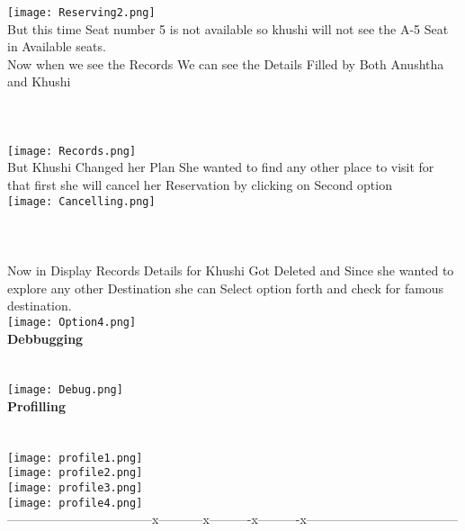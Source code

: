 \documentclass{article}
\begin{document}
\texttt{[image: Reserving2.png]}\\
But this time Seat number 5 is not available so khushi will not see the A-5 Seat in Available seats.\\
Now when we see the Records We can see the Details Filled by Both Anushtha and Khushi\\
\\
\\
\\
\texttt{[image: Records.png]}\\
\newpage
%
But Khushi Changed her Plan She wanted to find any other place to visit for that first she will cancel her Reservation by clicking on Second option\\
\texttt{[image: Cancelling.png]}\\
\\
\\
\\
Now in Display Records Details for Khushi Got Deleted and Since she wanted to explore any other Destination she can Select option forth and check for famous destination.\\
\texttt{[image: Option4.png]}\\
\Large \textbf{Debbugging}\\
\\
\\
\texttt{[image: Debug.png]}\\
\newpage
\Large \textbf{Profilling}\\
\\
\\
\texttt{[image: profile1.png]}\\
\texttt{[image: profile2.png]}\\
\texttt{[image: profile3.png]}\\
\texttt{[image: profile4.png]}\\
-----------------------------------x-----------x----------x----------x------------------------------------
\end{document}
